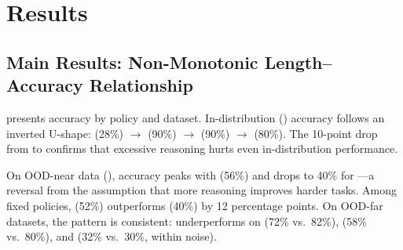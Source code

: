 \section{Results}
\label{sec:results}

\subsection{Main Results: Non-Monotonic Length--Accuracy Relationship}
\label{sec:main_results}

 presents accuracy by policy and dataset. In-distribution (\gsmk) accuracy follows an inverted U-shape: \pnone (28\%) $\rightarrow$ \pshort (90\%) $\rightarrow$ \pmedium (90\%) $\rightarrow$ \plong (80\%). The 10-point drop from \pmedium to \plong confirms that excessive reasoning hurts even in-distribution performance.

\begin{table}[t]
    \centering
    \caption{Accuracy (\%) by policy and dataset on \nano ($n=50$ per cell). Best result per column in \textbf{bold}. \gsmk is in-distribution; \mathfive is OOD-near; remaining datasets are OOD-far. The \plong policy underperforms \pshort on four of five benchmarks.}
    \label{tab:main}
\end{table}

On OOD-near data (\mathfive), accuracy peaks with \padaptive (56\%) and drops to 40\% for \plong---a reversal from the assumption that more reasoning improves harder tasks. Among fixed policies, \pmedium (52\%) outperforms \plong (40\%) by 12 percentage points. On OOD-far datasets, the pattern is consistent: \plong underperforms \pshort on \arcc (72\% vs.\ 82\%), \csqa (58\% vs.\ 80\%), and \mmlustem (32\% vs.\ 30\%, within noise).

